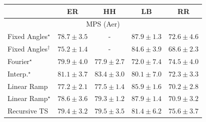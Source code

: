 \begin{tabular}{l|cccc|}
\toprule
            & ER & HH & LB & RR \\
\midrule
\multicolumn{5}{c}{\rule{0pt}{8pt}MPS (Aer)} \\
\midrule
Fixed Angles$^\star$ & {\cellcolor[HTML]{8B61AC}} \color[HTML]{F1F1F1} $78.7\pm 3.5$ & {\cellcolor[HTML]{000000}} \color[HTML]{F1F1F1} {\cellcolor{white}} \color{black} - & {\cellcolor[HTML]{760C71}} \color[HTML]{F1F1F1} $87.9\pm 1.3$ & {\cellcolor[HTML]{8D98C7}} \color[HTML]{F1F1F1} $72.6\pm 4.6$ \\
Fixed Angles$^\dagger$ & {\cellcolor[HTML]{8C80BB}} \color[HTML]{F1F1F1} $75.2\pm 1.4$ & {\cellcolor[HTML]{000000}} \color[HTML]{F1F1F1} {\cellcolor{white}} \color{black} - & {\cellcolor[HTML]{84278C}} \color[HTML]{F1F1F1} $84.6\pm 3.9$ & {\cellcolor[HTML]{9DB9D9}} \color[HTML]{000000} $68.6\pm 2.3$ \\
Fourier$^\star$ & {\cellcolor[HTML]{8A55A7}} \color[HTML]{F1F1F1} $79.9\pm 4.0$ & {\cellcolor[HTML]{8C68AF}} \color[HTML]{F1F1F1} $77.9\pm 2.7$ & {\cellcolor[HTML]{8F9DC9}} \color[HTML]{F1F1F1} $72.0\pm 7.4$ & {\cellcolor[HTML]{8C86BE}} \color[HTML]{F1F1F1} $74.5\pm 4.0$ \\
Interp.$^\star$ & {\cellcolor[HTML]{894BA2}} \color[HTML]{F1F1F1} $81.1\pm 3.7$ & {\cellcolor[HTML]{863394}} \color[HTML]{F1F1F1} $83.4\pm 3.0$ & {\cellcolor[HTML]{8A54A6}} \color[HTML]{F1F1F1} $80.1\pm 7.0$ & {\cellcolor[HTML]{8E9AC8}} \color[HTML]{F1F1F1} $72.3\pm 3.3$ \\
Linear Ramp & {\cellcolor[HTML]{8C6EB3}} \color[HTML]{F1F1F1} $77.2\pm 2.1$ & {\cellcolor[HTML]{8C6CB1}} \color[HTML]{F1F1F1} $77.5\pm 1.4$ & {\cellcolor[HTML]{821982}} \color[HTML]{F1F1F1} $85.9\pm 1.6$ & {\cellcolor[HTML]{96ACD2}} \color[HTML]{F1F1F1} $70.2\pm 2.8$ \\
Linear Ramp$^\star$ & {\cellcolor[HTML]{8B61AC}} \color[HTML]{F1F1F1} $78.6\pm 3.6$ & {\cellcolor[HTML]{8A5AA9}} \color[HTML]{F1F1F1} $79.3\pm 1.2$ & {\cellcolor[HTML]{760C71}} \color[HTML]{F1F1F1} $87.9\pm 1.4$ & {\cellcolor[HTML]{94A6CE}} \color[HTML]{F1F1F1} $70.9\pm 3.2$ \\
Recursive TS & {\cellcolor[HTML]{8A5AA9}} \color[HTML]{F1F1F1} $79.4\pm 3.2$ & {\cellcolor[HTML]{8A59A8}} \color[HTML]{F1F1F1} $79.5\pm 3.5$ & {\cellcolor[HTML]{8948A0}} \color[HTML]{F1F1F1} $81.4\pm 6.2$ & {\cellcolor[HTML]{8C7DBA}} \color[HTML]{F1F1F1} $75.6\pm 3.7$ \\

\end{tabular}
